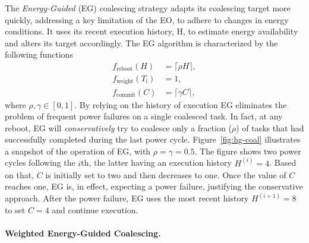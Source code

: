 The \emph{Energy-Guided} (EG) coalescing strategy adapts its coalescing target more quickly, addressing a key limitation of the EO, to adhere to changes in energy conditions. It uses its recent execution history, H, to estimate energy availability and alters its target accordingly. The EG algorithm is characterized by the following functions
%
\begin{equation}
	\begin{split}
		 f_\text{reboot}(H) & = \lceil \rho H \rceil,\\
		 f_\text{weight}(T_\text{i}) & = 1, \\
		 f_\text{commit}(C) & = \lceil \gamma C \rceil,
	\end{split}
	\label{eq:eg}
\end{equation}
%
where $\rho, \gamma \in [0, 1]$. By relying on the history of execution EG eliminates the problem of frequent power failures on a single coalesced task. In fact, at any reboot, EG will {\em conservatively} try to coalesce only a fraction ($\rho$) of tasks that had successfully completed during the last power cycle.
Figure~\ref{fig:hg-coal} illustrates a snapshot of the operation of EG, with $\rho = \gamma = 0.5$. The figure shows two power cycles following the $i$th, the latter having an execution history $H^{(i)} = 4$. Based on that, $C$ is initially set to two and then decreases to one. Once the value of $C$ reaches one, EG is, in effect, expecting a power failure, justifying the conservative approach. After the power failure, EG uses the most recent history $H^{(i+1)} = 8$ to set $C = 4$ and continue execution.

\paragraph{Weighted Energy-Guided Coalescing.}
\label{subsec:energyTaskAware}

